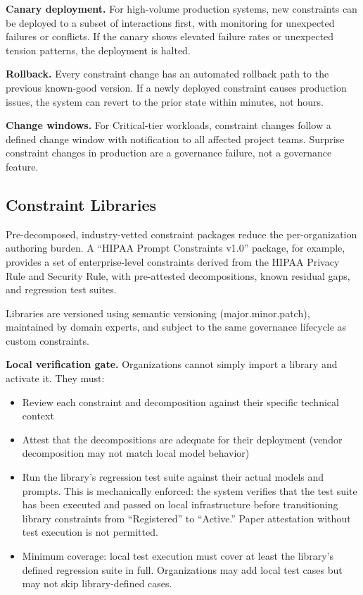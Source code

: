 \textbf{Canary deployment.} For high-volume production systems, new constraints can be deployed to a subset of interactions first, with monitoring for unexpected failures or conflicts. If the canary shows elevated failure rates or unexpected tension patterns, the deployment is halted.

\textbf{Rollback.} Every constraint change has an automated rollback path to the previous known-good version. If a newly deployed constraint causes production issues, the system can revert to the prior state within minutes, not hours.

\textbf{Change windows.} For Critical-tier workloads, constraint changes follow a defined change window with notification to all affected project teams. Surprise constraint changes in production are a governance failure, not a governance feature.

\subsection{Constraint Libraries}


Pre-decomposed, industry-vetted constraint packages reduce the per-organization authoring burden. A ``HIPAA Prompt Constraints v1.0'' package, for example, provides a set of enterprise-level constraints derived from the HIPAA Privacy Rule and Security Rule, with pre-attested decompositions, known residual gaps, and regression test suites.

Libraries are versioned using semantic versioning (major.minor.patch), maintained by domain experts, and subject to the same governance lifecycle as custom constraints.

\textbf{Local verification gate.} Organizations cannot simply import a library and activate it. They must:

\begin{itemize}
  \item Review each constraint and decomposition against their specific technical context
  \item Attest that the decompositions are adequate for their deployment (vendor decomposition may not match local model behavior)
  \item Run the library's regression test suite against their actual models and prompts. This is mechanically enforced: the system verifies that the test suite has been executed and passed on local infrastructure before transitioning library constraints from ``Registered'' to ``Active.'' Paper attestation without test execution is not permitted.
  \item Minimum coverage: local test execution must cover at least the library's defined regression suite in full. Organizations may add local test cases but may not skip library-defined cases.
\end{itemize}


